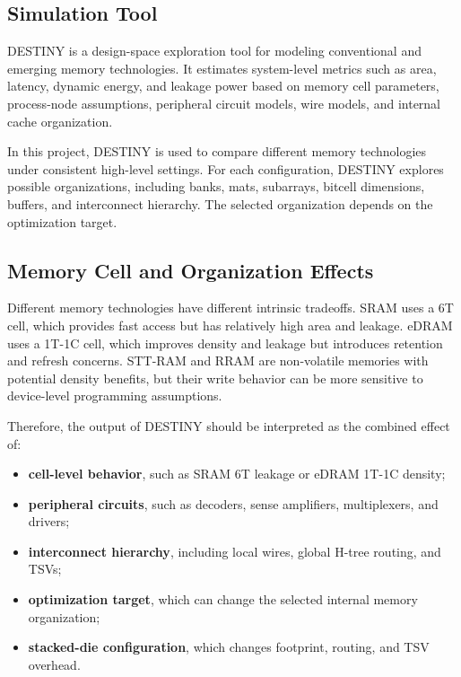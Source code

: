 \documentclass[conference]{IEEEtran}
\begin{document}
\subsection{Simulation Tool}

DESTINY\cite{destiny} is a design-space exploration tool for modeling conventional and emerging memory technologies. It estimates system-level metrics such as area, latency, dynamic energy, and leakage power based on memory cell parameters, process-node assumptions, peripheral circuit models, wire models, and internal cache organization.

In this project, DESTINY is used to compare different memory technologies under consistent high-level settings. For each configuration, DESTINY explores possible organizations, including banks, mats, subarrays, bitcell dimensions, buffers, and interconnect hierarchy. The selected organization depends on the optimization target.

\subsection{Memory Cell and Organization Effects}

Different memory technologies have different intrinsic tradeoffs. SRAM uses a 6T cell, which provides fast access but has relatively high area and leakage. eDRAM uses a 1T-1C cell, which improves density and leakage but introduces retention and refresh concerns. STT-RAM and RRAM are non-volatile memories with potential density benefits, but their write behavior can be more sensitive to device-level programming assumptions.

Therefore, the output of DESTINY should be interpreted as the combined effect of:
\begin{itemize}
    \item \textbf{cell-level behavior}, such as SRAM 6T leakage or eDRAM 1T-1C density;
    \item \textbf{peripheral circuits}, such as decoders, sense amplifiers, multiplexers, and drivers;
    \item \textbf{interconnect hierarchy}, including local wires, global H-tree routing, and TSVs;
    \item \textbf{optimization target}, which can change the selected internal memory organization;
    \item \textbf{stacked-die configuration}, which changes footprint, routing, and TSV overhead.
\end{itemize}
\end{document}
